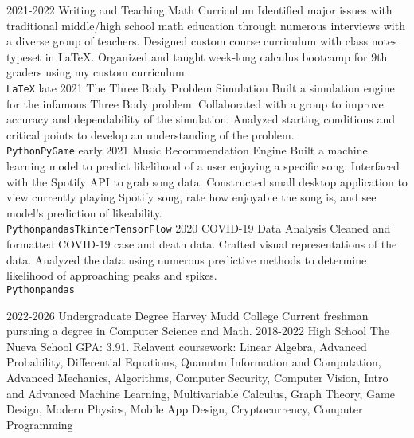 \documentclass[8pt]{developercv} %
\begin{document}
\begin{entrylist}
	\entry
		{2021-2022}
		{Writing and Teaching Math Curriculum}
		{}
		{Identified major issues with traditional middle/high school math education through numerous
		interviews with a diverse group of teachers. Designed custom course curriculum with class notes typeset in LaTeX.
		Organized and taught week-long calculus bootcamp for 9th graders using my custom curriculum. \\ 
		\texttt{LaTeX}}
	\entry
		{late 2021}
		{The Three Body Problem Simulation}
		{}
		{Built a simulation engine for the infamous Three Body problem. Collaborated with a group to 
		improve accuracy and dependability of the simulation. Analyzed starting conditions and critical points
		to develop an understanding of the problem.  \\
		 \texttt{Python}\slashsep\texttt{PyGame}}
	\entry
		{early 2021}
		{Music Recommendation Engine}
		{}
		{Built a machine learning model to predict likelihood of a user enjoying a specific song. 
		Interfaced with the Spotify API to grab song data. Constructed small desktop application to
		view currently playing Spotify song, rate how enjoyable the song is, and 
		see model's prediction of likeability. \\ 
		\texttt{Python}\slashsep\texttt{pandas}\slashsep\texttt{Tkinter}\slashsep\texttt{TensorFlow}}
	\entry 
		{2020}
		{COVID-19 Data Analysis}
		{}
		{Cleaned and formatted COVID-19 case and death data. Crafted visual representations of the data. 
		Analyzed the data using numerous predictive methods to determine likelihood of approaching peaks and
		spikes.  \\ 
		\texttt{Python}\slashsep\texttt{pandas}}
\end{entrylist}



\begin{entrylist}
	\entry
		{2022-2026}
		{Undergraduate Degree}
		{Harvey Mudd College}
		{Current freshman pursuing a degree in Computer Science and Math.}
	\entry
		{2018-2022}
		{High School}
		{The Nueva School}
		{GPA: 3.91. Relavent coursework: Linear Algebra, Advanced Probability, Differential Equations, Quanutm Information and Computation, Advanced Mechanics, Algorithms, Computer Security, Computer Vision, Intro and Advanced Machine Learning, Multivariable Calculus, Graph Theory, Game Design, Modern Physics, Mobile App Design, Cryptocurrency, Computer Programming}
\end{entrylist}
\end{document}
